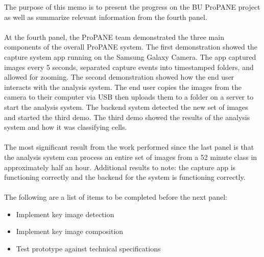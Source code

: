 \documentclass{texMemo}
\begin{document}
\maketitle
\noindent
The purpose of this memo is to present the progress on the BU ProPANE project as well as summarize relevant information from the fourth panel. \\
\\
At the fourth panel, the ProPANE team demonstrated the three main components of the overall ProPANE system. The first demonstration showed the capture system app running on the Samsung Galaxy Camera. The app captured images every 5 seconds, separated capture events into timestamped folders, and allowed for zooming. The second demonstration showed how the end user interacts with the analysis system. The end user copies the images from the camera to their computer via USB then uploads them to a folder on a server to start the analysis system. The backend system detected the new set of images and started the third demo. The third demo showed the results of the analysis system and how it was classifying cells. \\
\\
The most significant result from the work performed since the last panel is that the analysis system can process an entire set of images from a 52 minute class in approximately half an hour. Additional results to note: the capture app is functioning correctly and the backend for the system is functioning correctly. \\
\\
The following are a list of items to be completed before the next panel:
\begin{itemize}
	\item Implement key image detection
	\item Implement key image composition
	\item Test prototype against technical specifications
\end{itemize}
\end{document}
